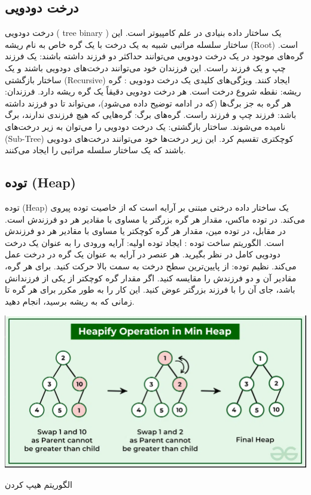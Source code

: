 \documentclass{article}
\begin{document}
\subsection{درخت دودویی}
درخت دودویی ( tree binary ) یک ساختار داده بنیادی در علم کامپیوتر است. این ساختار سلسله مراتبی شبیه به یک درخت با یک گره خاص به نام ریشه (Root) است. گره‌های موجود در یک درخت دودویی می‌توانند حداکثر دو فرزند داشته باشند: یک فرزند چپ و یک فرزند راست. این فرزندان خود می‌توانند درخت‌های دودویی باشند و یک ساختار بازگشتی (Recursive) ایجاد کنند.
\newline ویژگی‌های کلیدی یک درخت دودویی :
\newline گره ریشه: نقطه شروع درخت است. هر درخت دودویی دقیقاً یک گره ریشه دارد.
\newline فرزندان: هر گره به جز برگ‌ها (که در ادامه توضیح داده می‌شود)، می‌تواند تا دو فرزند داشته باشد: فرزند چپ و فرزند راست.
\newline گره‌های برگ: گره‌هایی که هیچ فرزندی ندارند، برگ نامیده می‌شوند. 
\newline ساختار بازگشتی: یک درخت دودویی را می‌توان به زیر درخت‌های (Sub-Tree) کوچکتری تقسیم کرد. این زیر درخت‌ها خود می‌توانند درخت‌های دودویی باشند که یک ساختار سلسله مراتبی را ایجاد می‌کنند.
\subsection{توده (Heap) }
توده (Heap) یک ساختار داده درختی مبتنی بر آرایه است که از خاصیت توده پیروی می‌کند. در توده ماکس، مقدار هر گره بزرگتر یا مساوی با مقادیر هر دو فرزندش است. در مقابل، در توده مین، مقدار هر گره کوچکتر یا مساوی با مقادیر هر دو فرزندش است.
\newline الگوریتم ساخت توده :
\newline ایجاد توده اولیه: آرایه ورودی را به عنوان یک درخت دودویی کامل در نظر بگیرید. هر عنصر در آرایه به عنوان یک گره در درخت عمل می‌کند.
\newline نظیم توده: از پایین‌ترین سطح درخت به سمت بالا حرکت کنید. برای هر گره، مقادیر آن و دو فرزندش را مقایسه کنید.
\newline  اگر مقدار گره کوچکتر از یکی از فرزندانش باشد، جای آن را با فرزند بزرگتر عوض کنید. این کار را به طور مکرر برای هر گره تا زمانی که به ریشه برسید، انجام دهید.

\begin{center}
   \includegraphics[scale=0.3]{heap.png}
\end{center}
\begin{center}
    \small الگوریتم هیپ کردن
\end{center}
\end{document}
